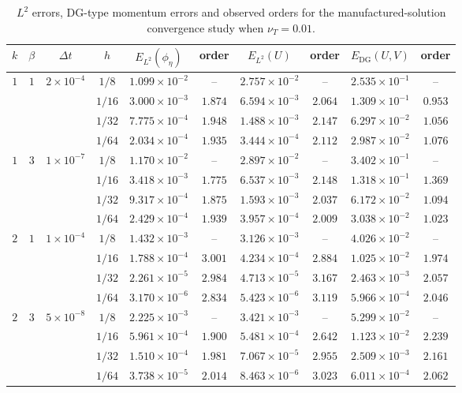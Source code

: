 \documentclass[pdflatex,sn-mathphys-num]{sn-jnl}%
\theoremstyle{thmstyleone}%
\theoremstyle{thmstyletwo}%
\theoremstyle{thmstylethree}%
\begin{document}
\begin{table}[htbp]
\centering
\caption{$L^2$ errors, DG-type momentum errors and observed orders for the manufactured-solution convergence study when $\nu_T=0.01$.}
\label{tab1}
\small
\begin{tabular}{cccccccccc}
\toprule
$k$ & $\beta$ & $\Delta t$ & $h$ & $E_{L^2}(\phi_\eta)$ & order & $E_{L^2}(U)$ & order & $E_{\mathrm{DG}}(U,V)$ & order\\
\midrule
$1$ & $1$ & $2\times 10^{-4}$ & $1/8$ & $1.099 \times 10^{-2}$ & -- & $2.757\times 10^{-2}$ & -- & $2.535\times 10^{-1}$ & --\\
 & & & $1/16$ & $3.000 \times 10^{-3}$ & $1.874$ & $6.594\times 10^{-3}$ & $2.064$ & $1.309 \times 10^{-1}$ & $0.953$\\
 & & & $1/32$ & $7.775 \times 10^{-4}$ & $1.948$ & $1.488\times 10^{-3}$ & $2.147$ & $6.297\times 10^{-2}$ & $1.056$\\
  & & & $1/64$ & $2.034 \times 10^{-4}$ & $1.935$ & $3.444\times 10^{-4}$ & $2.112$  & $2.987\times 10^{-2}$ & $1.076$ \\
$1$ & $3$ & $1\times 10^{-7}$ & $1/8$ & $1.170 \times 10^{-2}$ & -- & $2.897\times 10^{-2}$ & -- & $3.402\times 10^{-1}$ & -- \\
 & & & $1/16$ & $3.418 \times 10^{-3}$ & $1.775$ & $6.537\times 10^{-3}$ & $2.148$ & $1.318\times 10^{-1}$ & $1.369$ \\
 & & & $1/32$ & $9.317 \times 10^{-4}$ & $1.875$ & $1.593\times 10^{-3}$ & $2.037$ & $6.172\times 10^{-2}$ & $1.094$ \\
  & & & $1/64$ & $2.429 \times 10^{-4}$ & $1.939$ & $3.957\times 10^{-4}$ & $2.009$  & $3.038\times 10^{-2}$ & $1.023$ \\
$2$ & $1$ & $1\times 10^{-4}$ & $1/8$ & $1.432 \times 10^{-3}$ & -- & $3.126\times 10^{-3}$ & -- & $4.026\times 10^{-2}$ & -- \\
 & & & $1/16$ & $1.788 \times 10^{-4}$ & $3.001$ & $4.234\times 10^{-4}$ & $2.884$ & $1.025\times 10^{-2}$ & $1.974$ \\
 & & & $1/32$ & $2.261 \times 10^{-5}$ & $2.984$ & $4.713\times 10^{-5}$ & $3.167$ & $2.463\times 10^{-3}$ & $2.057$ \\
  & & & $1/64$ & $3.170 \times 10^{-6}$ & $2.834$ & $5.423\times 10^{-6}$ & $3.119$  & $5.966\times 10^{-4}$ & $2.046$ \\
$2$ & $3$ & $5\times 10^{-8}$ & $1/8$ & $2.225 \times 10^{-3}$ & -- & $3.421\times 10^{-3}$ & -- & $5.299\times 10^{-2}$ & -- \\
 & & & $1/16$ & $5.961 \times 10^{-4}$ & $1.900$ & $5.481\times 10^{-4}$ & $2.642$ & $1.123\times 10^{-2}$ & $2.239$\\
 & & & $1/32$ & $1.510 \times 10^{-4}$ & $1.981$ & $7.067\times 10^{-5}$ & $2.955$ & $2.509\times 10^{-3}$ & $2.161$\\
  & & & $1/64$ & $3.738 \times 10^{-5}$ & $2.014$ & $8.463\times 10^{-6}$ & $3.023$  & $6.011\times 10^{-4}$ & $2.062$\\
\bottomrule
\end{tabular}
\end{table}
\end{document}

